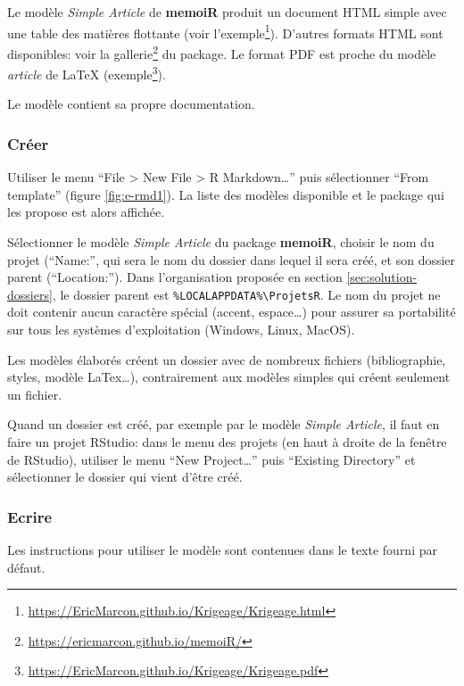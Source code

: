 \documentclass[
  12pt,
  french,
  a4paper,
  extrafontsizes,onecolumn,openright
  ]{memoir}
\begin{document}
Le modèle \emph{Simple Article} de \textbf{memoiR} produit un document HTML simple avec une table des matières flottante (voir l'exemple\footnote{\url{https://EricMarcon.github.io/Krigeage/Krigeage.html}}).
D'autres formats HTML sont disponibles: voir la gallerie\footnote{\url{https://ericmarcon.github.io/memoiR/}} du package.
Le format PDF est proche du modèle \emph{article} de LaTeX (exemple\footnote{\url{https://EricMarcon.github.io/Krigeage/Krigeage.pdf}}).

Le modèle contient sa propre documentation.

\hypertarget{cruxe9er}{%
\subsubsection{Créer}\label{cruxe9er}}

Utiliser le menu \enquote{File \textgreater{} New File \textgreater{} R Markdown\ldots{}} puis sélectionner \enquote{From template} (figure \ref{fig:e-rmd1}).
La liste des modèles disponible et le package qui les propose est alors affichée.

Sélectionner le modèle \emph{Simple Article} du package \textbf{memoiR}, choisir le nom du projet (\enquote{Name:}, qui sera le nom du dossier dans lequel il sera créé, et son dossier parent (\enquote{Location:}).
Dans l'organisation proposée en section \ref{sec:solution-dossiers}, le dossier parent est \texttt{\%LOCALAPPDATA\%\textbackslash{}ProjetsR}.
Le nom du projet ne doit contenir aucun caractère spécial (accent, espace\ldots) pour assurer sa portabilité sur tous les systèmes d'exploitation (Windows, Linux, MacOS).

Les modèles élaborés créent un dossier avec de nombreux fichiers (bibliographie, styles, modèle LaTex\ldots), contrairement aux modèles simples qui créent seulement un fichier.

Quand un dossier est créé, par exemple par le modèle \emph{Simple Article}, il faut en faire un projet RStudio: dans le menu des projets (en haut à droite de la fenêtre de RStudio), utiliser le menu \enquote{New Project\ldots{}} puis \enquote{Existing Directory} et sélectionner le dossier qui vient d'être créé.

\hypertarget{ecrire-1}{%
\subsubsection{Ecrire}\label{ecrire-1}}

Les instructions pour utiliser le modèle sont contenues dans le texte fourni par défaut.
\end{document}
